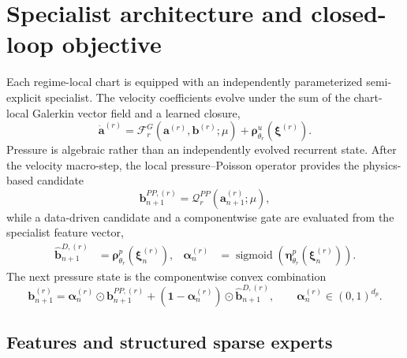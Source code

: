 \section{Specialist architecture and closed-loop objective}
\label{app:specialists}

Each regime-local chart is equipped with an independently parameterized
semi-explicit specialist. The velocity coefficients evolve under the sum of
the chart-local Galerkin vector field and a learned closure,
\begin{equation}
  \dot{\bm a}^{(r)}
  =
  \mathcal F_r^G\!\left(\bm a^{(r)},\bm b^{(r)};\mu\right)
  +\bm\rho^u_{\theta_r}\!\left(\bm\xi^{(r)}\right).
  \label{eq:app_hybrid_velocity_rhs}
\end{equation}
Pressure is algebraic rather than an independently evolved recurrent state.
After the velocity macro-step, the local pressure--Poisson operator provides
the physics-based candidate
\begin{equation}
  \bm b_{n+1}^{PP,(r)}
  =\mathcal Q_r^{PP}\!\left(\bm a_{n+1}^{(r)};\mu\right),
  \label{eq:app_pressure_poisson_candidate}
\end{equation}
while a data-driven candidate and a componentwise gate are evaluated from the
specialist feature vector,
\begin{align}
  \widehat{\bm b}_{n+1}^{D,(r)}
  &=\bm\rho^p_{\theta_r}\!\left(\bm\xi_n^{(r)}\right),
  &
  \bm\alpha_n^{(r)}
  &=\operatorname{sigmoid}\!\left(
      \bm\eta^p_{\theta_r}\!\left(\bm\xi_n^{(r)}\right)
    \right).
  \label{eq:app_pressure_candidates}
\end{align}
The next pressure state is the componentwise convex combination
\begin{equation}
  \bm b_{n+1}^{(r)}
  =\bm\alpha_n^{(r)}\odot\bm b_{n+1}^{PP,(r)}
  +\left(\bm 1-\bm\alpha_n^{(r)}\right)
   \odot\widehat{\bm b}_{n+1}^{D,(r)},
  \qquad \bm\alpha_n^{(r)}\in(0,1)^{d_p}.
  \label{eq:app_pressure_closure}
\end{equation}

\subsection{Features and structured sparse experts}

